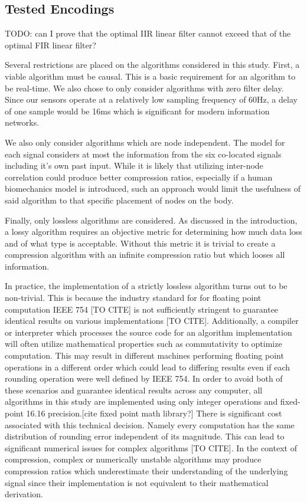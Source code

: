 \documentclass[journal]{IEEEtran}
\begin{document}
\subsection{Tested Encodings}

TODO: can I prove that the optimal IIR linear filter cannot exceed that of the optimal FIR linear filter?

Several restrictions are placed on the algorithms considered in this study. First, a viable algorithm must be causal. This is a basic requirement for an algorithm to be real-time. We also chose to only consider algorithms with zero filter delay. Since our sensors operate at a relatively low sampling frequency of 60Hz, a delay of one sample would be 16ms which is significant for modern information networks.

We also only consider algorithms which are node independent. The model for each signal considers at most the information from the six co-located signals including it's own past input. While it is likely that utilizing inter-node correlation could produce better compression ratios, especially if a human biomechanics model is introduced, such an approach would limit the usefulness of said algorithm to that specific placement of nodes on the body.

Finally, only lossless algorithms are considered. As discussed in the introduction, a lossy algorithm requires an objective metric for determining how much data loss and of what type is acceptable. Without this metric it is trivial to create a compression algorithm with an infinite compression ratio but which looses all information.

In practice, the implementation of a strictly lossless algorithm turns out to be non-trivial. This is because the industry standard for for floating point computation IEEE 754 [TO CITE] is not sufficiently stringent to guarantee identical results on various implementations [TO CITE]. Additionally, a compiler or interpreter which processes the source code for an algorithm implementation will often utilize mathematical properties such as commutativity to optimize computation. This may result in different machines performing floating point operations in a different order which could lead to differing results even if each rounding operation were well defined by IEEE 754. In order to avoid both of these scenarios and guarantee identical results across any computer, all algorithms in this study are implemented using only integer operations and fixed-point 16.16 precision.[cite fixed point math library?] There is significant cost associated with this technical decision. Namely every computation has the same distribution of rounding error independent of its magnitude. This can lead to significant numerical issues for complex algorithms [TO CITE]. In the context of compression, complex or numerically unstable algorithms may produce compression ratios which underestimate their understanding of the underlying signal since their implementation is not equivalent to their mathematical derivation.
\end{document}
